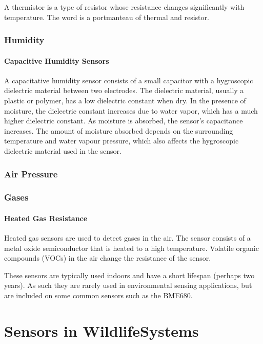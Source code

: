 \documentclass[
]{book}
\begin{document}
A thermistor is a type of resistor whose resistance changes significantly with temperature. The word is a portmanteau of thermal and resistor.

\subsection{Humidity}\label{humidity}

\subsubsection{Capacitive Humidity Sensors}\label{capacitive-humidity-sensors}

A capacitative humidity sensor consists of a small capacitor with a hygroscopic dielectric material between two electrodes. The dielectric material, usually a plastic or polymer, has a low dielectric constant when dry. In the presence of moisture, the dielectric constant increases due to water vapor, which has a much higher dielectric constant. As moisture is absorbed, the sensor's capacitance increases. The amount of moisture absorbed depends on the surrounding temperature and water vapour pressure, which also affects the hygroscopic dielectric material used in the sensor.

\subsection{Air Pressure}\label{air-pressure}

\subsection{Gases}\label{gases}

\subsubsection{Heated Gas Resistance}\label{heated-gas-resistance}

Heated gas sensors are used to detect gases in the air. The sensor consists of a metal oxide semiconductor that is heated to a high temperature. Volatile organic compounds (VOCs) in the air change the resistance of the sensor.

These sensors are typically used indoors and have a short lifespan (perhaps two years). As such they are rarely used in environmental sensing applications, but are included on some common sensors such as the BME680.

\chapter{Sensors in WildlifeSystems}\label{sensors-in-wildlifesystems}
\end{document}
